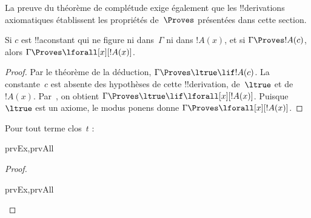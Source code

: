 \documentclass[../../../include/open-logic-section]{subfiles}
\begin{document}


\begin{explain}
La preuve du théorème de complétude exige également que les
!!{derivation}s axiomatiques établissent les propriétés de~$\Proves$
présentées dans cette section.
\end{explain}

\begin{thm}
Si $c$ est !!a{constant} qui ne figure ni dans~$\Gamma$ ni dans
$!A(x)$, et si $\Gamma \Proves !A(c)$, alors
$\Gamma \Proves \lforall[x][!A(x)]$.
\end{thm}

\begin{proof}
Par le théorème de la déduction,
$\Gamma \Proves \ltrue \lif !A(c)$. La constante~$c$ est absente
des hypothèses de cette !!{derivation}, de~$\ltrue$ et de~$!A(x)$.
Par~\QR{}, on obtient $\Gamma \Proves \ltrue \lif \lforall[x][!A(x)]$.
Puisque $\ltrue$ est un axiome, le modus ponens donne
$\Gamma \Proves \lforall[x][!A(x)]$.
\end{proof}

\begin{prop}
Pour tout terme clos~$t$ :
\begin{tagenumerate}{prvEx,prvAll}

\end{tagenumerate}
\end{prop}

\begin{proof}
\begin{tagenumerate}{prvEx,prvAll}
\end{tagenumerate}
\end{proof}
\end{document}
